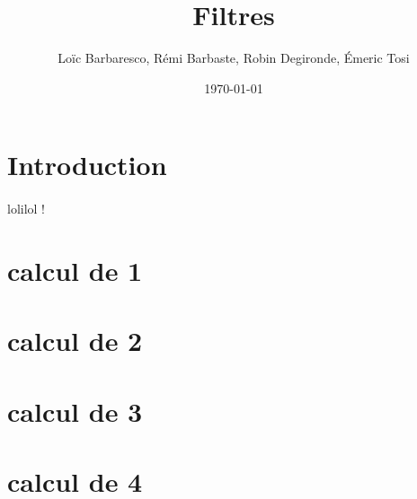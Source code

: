 \documentclass[a4paper,11pt]{article}
\title{Filtres}
\author{Loïc Barbaresco, Rémi Barbaste, Robin Degironde, Émeric Tosi}
\date{\today}
\begin{document}
    \maketitle{}

    \setcounter{tocdepth}{1} %
    \renewcommand{\contentsname}{Sommaire} %
    \tableofcontents{} %
    \clearpage



\section{Introduction}
        \paragraph{}
lolilol !

\section{calcul de 1}
    \paragraph{}

\section{calcul de 2}
    \paragraph{}

\section{calcul de 3}
    \paragraph{}

\section{calcul de 4}
    \paragraph{}
\end{document}
